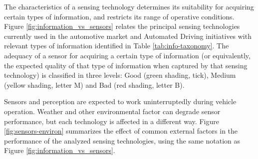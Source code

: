 The characteristics of a sensing technology determines its 
suitability for acquiring certain types of information, and restricts its range 
of operative conditions.
Figure \ref{fig:information_vs_sensors} relates the principal sensing 
technologies currently used in the automotive market and Automated Driving
initiatives with relevant types of information identified in Table 
\ref{tab:info-taxonomy}. The adequacy of a sensor for acquiring a certain type
of information (or equivalently, the expected quality of that type of
information when captured by that sensing technology) is classified in three
levels: Good (green shading, tick), Medium (yellow shading, letter M) and Bad
(red shading, letter B).

Sensors and perception are expected to work uninterruptedly during vehicle 
operation. Weather and other environmental factor can degrade sensor
performance, but each technology is affected in a different way. 
Figure \ref{fig:sensors-environ} summarizes the effect of common external
factors in the performance of the analyzed sensing technologies, using the
same notation as Figure \ref{fig:information_vs_sensors}.

%

